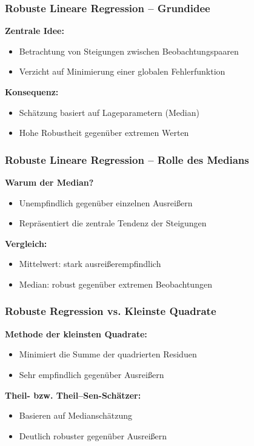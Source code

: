 \documentclass{beamer}
\begin{document}
	\begin{frame}
		\frametitle{Robuste Lineare Regression – Grundidee}
		
		\textbf{Zentrale Idee:}
		\begin{itemize}
			\item Betrachtung von Steigungen zwischen Beobachtungspaaren
			\item Verzicht auf Minimierung einer globalen Fehlerfunktion
		\end{itemize}
		
		\vspace{0.5em}
		
		\textbf{Konsequenz:}
		\begin{itemize}
			\item Schätzung basiert auf Lageparametern (Median)
			\item Hohe Robustheit gegenüber extremen Werten
		\end{itemize}
	\end{frame}
	
	\begin{frame}
		\frametitle{Robuste Lineare Regression – Rolle des Medians}
		
		\textbf{Warum der Median?}
		\begin{itemize}
			\item Unempfindlich gegenüber einzelnen Ausreißern
			\item Repräsentiert die zentrale Tendenz der Steigungen
		\end{itemize}
		
		\vspace{0.5em}
		
		\textbf{Vergleich:}
		\begin{itemize}
			\item Mittelwert: stark ausreißerempfindlich
			\item Median: robust gegenüber extremen Beobachtungen
		\end{itemize}
	\end{frame}
	
	\begin{frame}
		\frametitle{Robuste Regression vs. Kleinste Quadrate}
		
		\textbf{Methode der kleinsten Quadrate:}
		\begin{itemize}
			\item Minimiert die Summe der quadrierten Residuen
			\item Sehr empfindlich gegenüber Ausreißern
		\end{itemize}
		
		\vspace{0.5em}
		
		\textbf{Theil- bzw. Theil–Sen-Schätzer:}
		\begin{itemize}
			\item Basieren auf Medianschätzung
			\item Deutlich robuster gegenüber Ausreißern
		\end{itemize}
	\end{frame}
	
\end{document}
